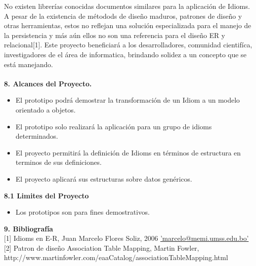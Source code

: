 \begin{flushleft}
No existen librerías conocidas documentos similares para la aplicación de Idioms.
A pesar de la existencia de métodods de diseño maduros, patrones de diseño y otras herramientas, estos no reflejan una solución especializada para el manejo de la persistencia y más aún ellos no son una referencia para el diseño ER y relacional[1].
Este proyecto beneficiará a los desarrolladores, comunidad cientifíca, investigadores de el área de informatica, brindando solidez a un concepto que se está manejando.\\
\\ \textbf{8. Alcances del Proyecto.}\\
\begin{itemize}
	\item El prototipo podrá demostrar la transformación de un Idiom a un modelo orientado a objetos.
	\item El prototipo solo realizará la aplicación para un grupo de idioms determinados.
	\item El proyecto permitirá la definición de Idioms en términos de estructura en terminos de sus definiciones.
	\item El proyecto aplicará sus estructuras sobre datos genéricos.
\end{itemize}
\textbf{8.1 Limites del Proyecto}
\begin{itemize}
	\item Los prototipos son para fines demostrativos.
\end{itemize}
\textbf{9. Bibliografía}\\
{[1] Idioms en E-R, Juan Marcelo Flores Soliz, 2006 \hyperref[marcelo@memi.umss.edu.bo]{'marcelo@memi.umss.edu.bo'}}\\
{[2] Patron de diseño Association Table Mapping, Martin Fowler, http://www.martinfowler.com/eaaCatalog/associationTableMapping.html}




\end{flushleft}